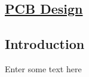
\vspace*{8.5cm}

\begin{flushright}
	\section{\huge{\underline{PCB Design}}}
\end{flushright}

\subsection{Introduction}
	Enter some text here